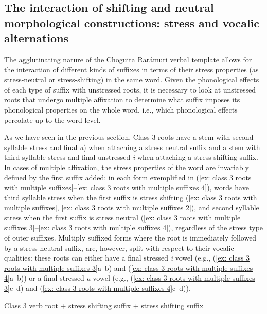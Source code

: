 \subsection{The interaction of shifting and neutral morphological constructions: stress and vocalic alternations}
\label{subsec: interaction of shifting and neutral morphological constructions}

The agglutinating nature of the Choguita Rarámuri verbal template allows for the interaction of different kinds of suffixes in terms of their stress properties (as stress-neutral or stress-shifting) in the same word. Given the phonological effects of each type of suffix with unstressed roots, it is necessary to look at unstressed roots that undergo multiple affixation to determine what suffix imposes its phonological properties on the whole word, i.e., which phonological effects percolate up to the word level.

As we have seen in the previous section, Class 3 roots have a stem with second syllable stress and final \textit{a}) when attaching a stress neutral suffix and a stem with third syllable stress and final unstressed \textit{i} when attaching a stress shifting suffix. In cases of multiple affixation, the stress properties of the word are invariably defined by the first suffix added: in each form exemplified in (\ref{ex: class 3 roots with multiple suffixes}--\ref{ex: class 3 roots with multiple suffixes 4}), words have third syllable stress when the first suffix is stress shifting (\ref{ex: class 3 roots with multiple suffixes}, \ref{ex: class 3 roots with multiple suffixes 2}), and second syllable stress when the first suffix is stress neutral (\ref{ex: class 3 roots with multiple suffixes 3}--\ref{ex: class 3 roots with multiple suffixes 4}), regardless of the stress type of outer suffixes. Multiply suffixed forms where the root is immediately followed by a stress neutral suffix, are, however, split with respect to their vocalic qualities: these roots can either have a final stressed \textit{i} vowel (e.g., (\ref{ex: class 3 roots with multiple suffixes 3}a--b) and (\ref{ex: class 3 roots with multiple suffixes 4}a--b)) or a final stressed \textit{a} vowel (e.g., (\ref{ex: class 3 roots with multiple suffixes 3}c--d) and (\ref{ex: class 3 roots with multiple suffixes 4}c--d)).

\ea\label{ex: class 3 roots with multiple suffixes}
{Class 3 verb root + stress shifting suffix + stress shifting suffix}

